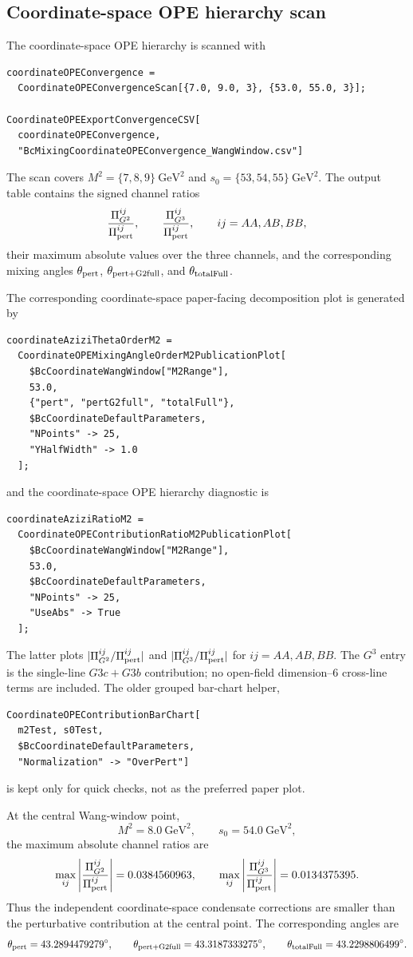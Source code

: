 \documentclass[11pt]{article}
\begin{document}
\subsection{Coordinate-space OPE hierarchy scan}

The coordinate-space OPE hierarchy is scanned with
\begin{verbatim}
coordinateOPEConvergence =
  CoordinateOPEConvergenceScan[{7.0, 9.0, 3}, {53.0, 55.0, 3}];

CoordinateOPEExportConvergenceCSV[
  coordinateOPEConvergence,
  "BcMixingCoordinateOPEConvergence_WangWindow.csv"]
\end{verbatim}
The scan covers \(M^2=\{7,8,9\}~\mathrm{GeV}^2\) and
\(s_0=\{53,54,55\}~\mathrm{GeV}^2\).  The output table contains the signed
channel ratios
\[
  \frac{\Pi_{G^2}^{ij}}{\Pi_{\rm pert}^{ij}},
  \qquad
  \frac{\Pi_{G^3}^{ij}}{\Pi_{\rm pert}^{ij}},
  \qquad ij=AA,AB,BB,
\]
their maximum absolute values over the three channels, and the corresponding
mixing angles \(\theta_{\rm pert}\), \(\theta_{\rm pert+G2full}\), and
\(\theta_{\rm totalFull}\).

The corresponding coordinate-space paper-facing decomposition plot is
generated by
\begin{verbatim}
coordinateAziziThetaOrderM2 =
  CoordinateOPEMixingAngleOrderM2PublicationPlot[
    $BcCoordinateWangWindow["M2Range"],
    53.0,
    {"pert", "pertG2full", "totalFull"},
    $BcCoordinateDefaultParameters,
    "NPoints" -> 25,
    "YHalfWidth" -> 1.0
  ];
\end{verbatim}
and the coordinate-space OPE hierarchy diagnostic is
\begin{verbatim}
coordinateAziziRatioM2 =
  CoordinateOPEContributionRatioM2PublicationPlot[
    $BcCoordinateWangWindow["M2Range"],
    53.0,
    $BcCoordinateDefaultParameters,
    "NPoints" -> 25,
    "UseAbs" -> True
  ];
\end{verbatim}
The latter plots
\(|\Pi_{G^2}^{ij}/\Pi_{\rm pert}^{ij}|\) and
\(|\Pi_{G^3}^{ij}/\Pi_{\rm pert}^{ij}|\) for \(ij=AA,AB,BB\).  The \(G^3\)
entry is the single-line \(G3c+G3b\) contribution; no open-field
dimension--6 cross-line terms are included.  The older grouped bar-chart
helper,
\begin{verbatim}
CoordinateOPEContributionBarChart[
  m2Test, s0Test,
  $BcCoordinateDefaultParameters,
  "Normalization" -> "OverPert"]
\end{verbatim}
is kept only for quick checks, not as the preferred paper plot.

At the central Wang-window point,
\[
  M^2=8.0~\mathrm{GeV}^2,\qquad s_0=54.0~\mathrm{GeV}^2,
\]
the maximum absolute channel ratios are
\[
  \max_{ij}\left|
    \frac{\Pi_{G^2}^{ij}}{\Pi_{\rm pert}^{ij}}
  \right|
  =
  0.0384560963,
  \qquad
  \max_{ij}\left|
    \frac{\Pi_{G^3}^{ij}}{\Pi_{\rm pert}^{ij}}
  \right|
  =
  0.0134375395.
\]
Thus the independent coordinate-space condensate corrections are smaller than
the perturbative contribution at the central point.  The corresponding angles
are
\[
  \theta_{\rm pert}=43.2894479279^\circ,\qquad
  \theta_{\rm pert+G2full}=43.3187333275^\circ,\qquad
  \theta_{\rm totalFull}=43.2298806499^\circ.
\]
\end{document}
